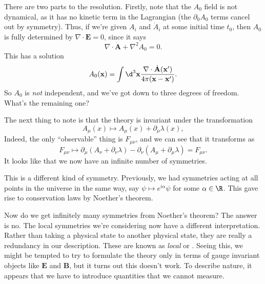 \documentclass[a4paper]{article}
\begin{document}
There are two parts to the resolution. Firstly, note that the $A_0$ field is not dynamical, as it has no kinetic term in the Lagrangian (the $\partial_0 A_0$ terms cancel out by symmetry). Thus, if we're given $A_i$ and $\dot{A}_i$ at some initial time $t_0$, then $A_0$ is fully determined by $\nabla \cdot \mathbf{E} = 0$, since it says
\[
  \nabla \cdot \dot{\mathbf{A}} + \nabla^2 A_0 = 0.
\]
This has a solution
\[
  A_0(\mathbf{x}) = \int \d^3 \mathbf{x} \frac{\nabla \cdot \dot{\mathbf{A}}(\mathbf{x}')}{4\pi(\mathbf{x} - \mathbf{x}')}.
\]
So $A_0$ is \emph{not} independent, and we've got down to three degrees of freedom. What's the remaining one?

The next thing to note is that the theory is invariant under the transformation
\[
  A_\mu (x) \mapsto A_\mu(x) + \partial_\mu \lambda(x),
\]
Indeed, the only ``observable'' thing is $F_{\mu\nu}$, and we can see that it transforms as
\[
  F_{\mu\nu} \mapsto \partial_\mu (A_\nu + \partial_\nu \lambda) - \partial_\nu(A_\mu + \partial_\mu \lambda) = F_{\mu\nu}.
\]
It looks like that we now have an infinite number of symmetries.

This is a different kind of symmetry. Previously, we had symmetries acting at all points in the universe in the same way, say $\psi \mapsto e^{i\alpha}\psi$ for some $\alpha \in \R$. This gave rise to conservation laws by Noether's theorem.

Now do we get infinitely many symmetries from Noether's theorem? The answer is no. The local symmetries we're considering now have a different interpretation. Rather than taking a physical state to another physical state, they are really a redundancy in our description. These are known as \emph{local} or .
%
%
%
%
Seeing this, we might be tempted to try to formulate the theory only in terms of gauge invariant objects like $\mathbf{E}$ and $\mathbf{B}$, but it turns out this doesn't work. To describe nature, it appears that we have to introduce quantities that we cannot measure.
\end{document}
